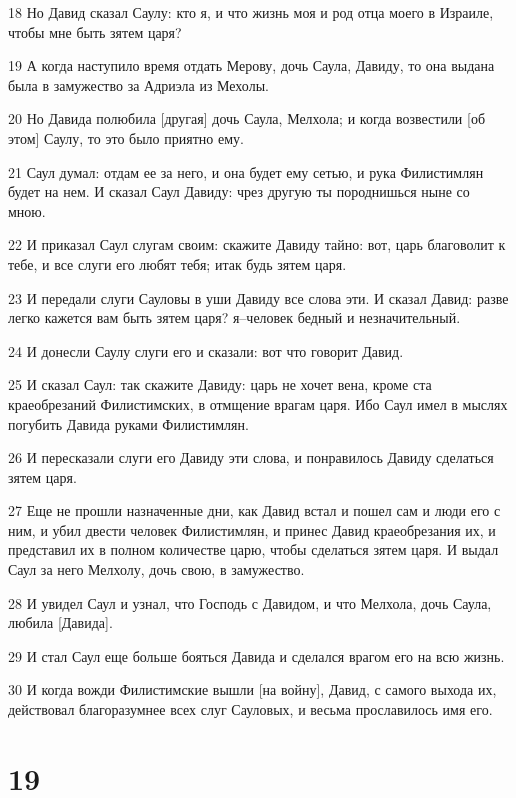 \par 18 Но Давид сказал Саулу: кто я, и что жизнь моя и род отца моего в Израиле, чтобы мне быть зятем царя?
\par 19 А когда наступило время отдать Мерову, дочь Саула, Давиду, то она выдана была в замужество за Адриэла из Мехолы.
\par 20 Но Давида полюбила [другая] дочь Саула, Мелхола; и когда возвестили [об этом] Саулу, то это было приятно ему.
\par 21 Саул думал: отдам ее за него, и она будет ему сетью, и рука Филистимлян будет на нем. И сказал Саул Давиду: чрез другую ты породнишься ныне со мною.
\par 22 И приказал Саул слугам своим: скажите Давиду тайно: вот, царь благоволит к тебе, и все слуги его любят тебя; итак будь зятем царя.
\par 23 И передали слуги Сауловы в уши Давиду все слова эти. И сказал Давид: разве легко кажется вам быть зятем царя? я--человек бедный и незначительный.
\par 24 И донесли Саулу слуги его и сказали: вот что говорит Давид.
\par 25 И сказал Саул: так скажите Давиду: царь не хочет вена, кроме ста краеобрезаний Филистимских, в отмщение врагам царя. Ибо Саул имел в мыслях погубить Давида руками Филистимлян.
\par 26 И пересказали слуги его Давиду эти слова, и понравилось Давиду сделаться зятем царя.
\par 27 Еще не прошли назначенные дни, как Давид встал и пошел сам и люди его с ним, и убил двести человек Филистимлян, и принес Давид краеобрезания их, и представил их в полном количестве царю, чтобы сделаться зятем царя. И выдал Саул за него Мелхолу, дочь свою, в замужество.
\par 28 И увидел Саул и узнал, что Господь с Давидом, и что Мелхола, дочь Саула, любила [Давида].
\par 29 И стал Саул еще больше бояться Давида и сделался врагом его на всю жизнь.
\par 30 И когда вожди Филистимские вышли [на войну], Давид, с самого выхода их, действовал благоразумнее всех слуг Сауловых, и весьма прославилось имя его.

\chapter{19}

